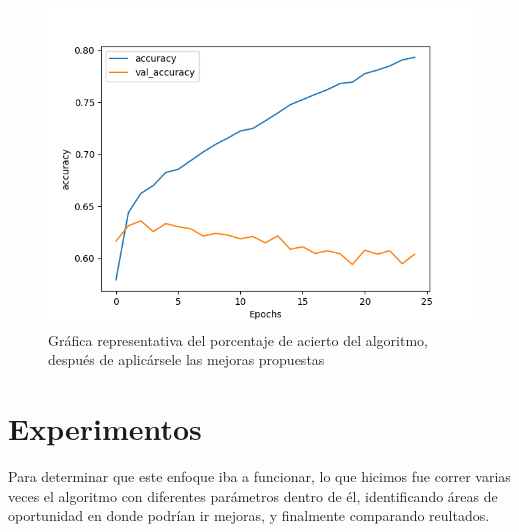 \documentclass[a4]{sciposter}
\begin{document}
\begin{multicols}{3}
\begin{figure}
	\centering
	\captionsetup{type=figure}
	\setcounter{figure}{1}
	\includegraphics[scale=1.3]{img/Accuracy 2021-07.png}
	\caption{Gráfica representativa del porcentaje de acierto del algoritmo, después de aplicársele las mejoras propuestas}	
\end{figure}

\section{Experimentos}

Para determinar que este enfoque iba a funcionar, lo que hicimos fue correr varias veces el algoritmo con diferentes parámetros dentro de él, identificando áreas de oportunidad en donde podrían ir mejoras, y finalmente comparando reultados.


\end{multicols}
\end{document}
